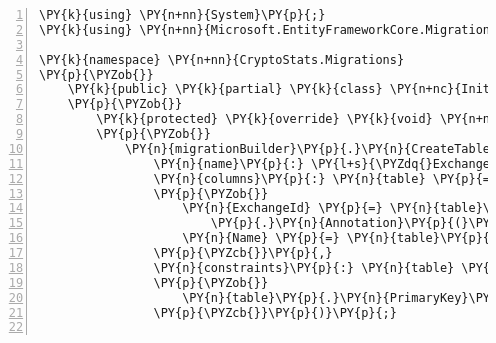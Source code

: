 \def\PYZbs{\char`\\}
\def\PYZus{\char`\_}
\def\PYZob{\char`\{}
\def\PYZcb{\char`\}}
\def\PYZca{\char`\^}
\def\PYZam{\char`\&}
\def\PYZlt{\char`\<}
\def\PYZgt{\char`\>}
\def\PYZsh{\char`\#}
\def\PYZpc{\char`\%}
\def\PYZdl{\char`\$}
\def\PYZhy{\char`\-}
\def\PYZsq{\char`\'}
\def\PYZdq{\char`\"}
\def\PYZti{\char`\~}
\def\PYZat{@}
\def\PYZlb{[}
\def\PYZrb{]}
\makeatother\begin{Verbatim}[commandchars=\\\{\},numbers=left,firstnumber=1,stepnumber=1,numberblanklines=0]
\PY{k}{using} \PY{n+nn}{System}\PY{p}{;}
\PY{k}{using} \PY{n+nn}{Microsoft.EntityFrameworkCore.Migrations}\PY{p}{;}

\PY{k}{namespace} \PY{n+nn}{CryptoStats.Migrations}
\PY{p}{\PYZob{}}
    \PY{k}{public} \PY{k}{partial} \PY{k}{class} \PY{n+nc}{InitialCreate} \PY{p}{:} \PY{n}{Migration}
    \PY{p}{\PYZob{}}
        \PY{k}{protected} \PY{k}{override} \PY{k}{void} \PY{n+nf}{Up}\PY{p}{(}\PY{n}{MigrationBuilder} \PY{n}{migrationBuilder}\PY{p}{)}
        \PY{p}{\PYZob{}}
            \PY{n}{migrationBuilder}\PY{p}{.}\PY{n}{CreateTable}\PY{p}{(}
                \PY{n}{name}\PY{p}{:} \PY{l+s}{\PYZdq{}Exchanges\PYZdq{}}\PY{p}{,}
                \PY{n}{columns}\PY{p}{:} \PY{n}{table} \PY{p}{=}\PY{p}{\PYZgt{}} \PY{k}{new}
                \PY{p}{\PYZob{}}
                    \PY{n}{ExchangeId} \PY{p}{=} \PY{n}{table}\PY{p}{.}\PY{n}{Column}\PY{p}{\PYZlt{}}\PY{k+kt}{int}\PY{p}{\PYZgt{}}\PY{p}{(}\PY{n}{nullable}\PY{p}{:} \PY{k}{false}\PY{p}{)}
                        \PY{p}{.}\PY{n}{Annotation}\PY{p}{(}\PY{l+s}{\PYZdq{}Sqlite:Autoincrement\PYZdq{}}\PY{p}{,} \PY{k}{true}\PY{p}{)}\PY{p}{,}
                    \PY{n}{Name} \PY{p}{=} \PY{n}{table}\PY{p}{.}\PY{n}{Column}\PY{p}{\PYZlt{}}\PY{k+kt}{string}\PY{p}{\PYZgt{}}\PY{p}{(}\PY{n}{nullable}\PY{p}{:} \PY{k}{true}\PY{p}{)}
                \PY{p}{\PYZcb{}}\PY{p}{,}
                \PY{n}{constraints}\PY{p}{:} \PY{n}{table} \PY{p}{=}\PY{p}{\PYZgt{}}
                \PY{p}{\PYZob{}}
                    \PY{n}{table}\PY{p}{.}\PY{n}{PrimaryKey}\PY{p}{(}\PY{l+s}{\PYZdq{}PK\PYZus{}Exchanges\PYZdq{}}\PY{p}{,} \PY{n}{x} \PY{p}{=}\PY{p}{\PYZgt{}} \PY{n}{x}\PY{p}{.}\PY{n}{ExchangeId}\PY{p}{)}\PY{p}{;}
                \PY{p}{\PYZcb{}}\PY{p}{)}\PY{p}{;}


\end{Verbatim}
